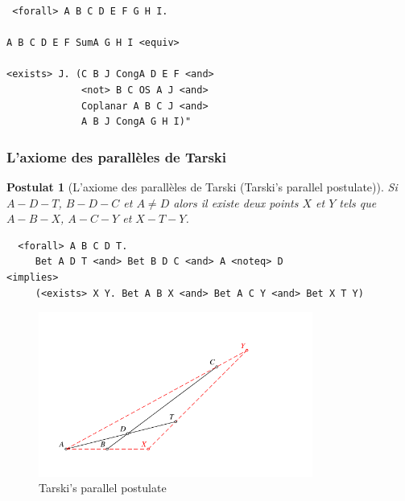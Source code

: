 \documentclass[8pt,a4paper]{article}
\theoremstyle{plain}
\newtheorem{postulat}{Postulat}
\begin{document}
\begin{tcolorbox}
\begin{verbatim}
 <forall> A B C D E F G H I.

A B C D E F SumA G H I <equiv>

<exists> J. (C B J CongA D E F <and> 
             <not> B C OS A J <and> 
             Coplanar A B C J <and> 
             A B J CongA G H I)"
\end{verbatim}
\end{tcolorbox}

\subsubsection{L'axiome des parallèles de Tarski}

  \begin{postulat}[L'axiome des parallèles de Tarski (Tarski's parallel postulate)]
    Si $A - D - T$, $B -D -C$ et $A \neq D$ alors
    il existe deux points $X$ et $Y$ tels que $A - B - X$, $A -C-Y$ et $X-T-Y$.
  \end{postulat}
  \begin{tcolorbox}
\begin{verbatim}
  <forall> A B C D T.
     Bet A D T <and> Bet B D C <and> A <noteq> D 
<implies>
     (<exists> X Y. Bet A B X <and> Bet A C Y <and> Bet X T Y)
\end{verbatim}
  \end{tcolorbox}
  \begin{figure}[H] %
  \centering
    \includegraphics[width=90mm]{fig01.pdf}
\caption{Tarski's parallel postulate\label{TarskiParallelPostulate}}
\end{figure}
\end{document}
